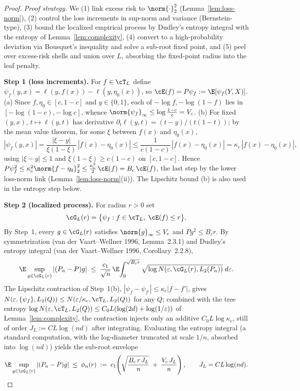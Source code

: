 \begin{proof}
\emph{Proof strategy.} We (1) link excess risk to $\norm{\cdot}_2^2$
(Lemma~\ref{lem:loss-norm}), (2) control the loss increments in sup-norm and
variance (Bernstein-type), (3) bound the localized empirical process by Dudley's
entropy integral with the entropy of Lemma~\ref{lem:complexity}, (4) convert to
a high-probability deviation via Bousquet's inequality and solve a sub-root
fixed point, and (5) peel over excess-risk shells and union over $L$, absorbing
the fixed-point radius into the leaf penalty.

\smallskip\noindent\textbf{Step 1 (loss increments).} For $f \in \cT_L$ define
$\psi_f(y,x) = \ell(y,f(x)) - \ell(y,\eta_0(x))$, so
$\cE(f) = P\psi_f := \E[\psi_f(Y,X)]$.
(a) Since $f,\eta_0 \in [c,1-c]$ and $y\in\{0,1\}$, each of $-\log f, -\log(1-f)$
lies in $[-\log(1-c), -\log c]$, whence
$\norm{\psi_f}_\infty \le \log\frac{1-c}{c} = V_c$.
(b) For fixed $(y,x)$, $t \mapsto \ell(y,t)$ has derivative
$\partial_t \ell(y,t) = (t-y)/(t(1-t))$; by the mean value theorem, for some
$\xi$ between $f(x)$ and $\eta_0(x)$,
\[
  |\psi_f(y,x)| = \frac{|\xi - y|}{\xi(1-\xi)}\,|f(x)-\eta_0(x)|
  \le \frac{1}{c(1-c)}\,|f(x)-\eta_0(x)| = \kappa_c\,|f(x)-\eta_0(x)|,
\]
using $|\xi - y| \le 1$ and $\xi(1-\xi) \ge c(1-c)$ on $[c,1-c]$. Hence
$P\psi_f^2 \le \kappa_c^2 \norm{f-\eta_0}_2^2
\le \tfrac{\kappa_c^2}{2}\,\cE(f) = B_c\,\cE(f)$,
the last step by the lower loss-norm link (Lemma~\ref{lem:loss-norm}(ii)). The
Lipschitz bound (b) is also used in the entropy step below.

\smallskip\noindent\textbf{Step 2 (localized process).} For radius $r>0$ set
\[
  \cG_L(r) = \bigl\{ \psi_f : f \in \cT_L,\; \cE(f) \le r \bigr\}.
\]
By Step~1, every $g \in \cG_L(r)$ satisfies $\norm{g}_\infty \le V_c$ and
$Pg^2 \le B_c r$. By symmetrization (van der Vaart--Wellner 1996, Lemma~2.3.1)
and Dudley's entropy integral (van der Vaart--Wellner 1996, Corollary~2.2.8),
\[
  \E \sup_{g \in \cG_L(r)} |(P_n - P)g|
  \;\le\; \frac{c_1}{\sqrt n}\,
     \E \!\int_0^{\sqrt{B_c r}}
       \sqrt{\log N(\varepsilon, \cG_L(r), L_2(P_n))}\; d\varepsilon.
\]
The Lipschitz contraction of Step~1(b), $|\psi_f - \psi_{f'}| \le
\kappa_c |f - f'|$, gives
$N(\varepsilon, \{\psi_f\}, L_2(Q)) \le N(\varepsilon/\kappa_c, \cT_L, L_2(Q))$
for any $Q$; combined with the tree entropy
$\log N(\varepsilon, \cT_L, L_2(Q)) \le C_0 L(\log(2d) + \log(1/\varepsilon))$
of Lemma~\ref{lem:complexity}, the contraction injects only an additive
$C_0 L \log\kappa_c$, still of order $J_L := C L \log(nd)$ after integrating.
Evaluating the entropy integral (a standard computation, with the log-diameter
truncated at scale $1/n$, absorbed into $\log(nd)$) yields the sub-root envelope
\begin{equation}\label{eq:phi}
  \E \sup_{g \in \cG_L(r)} |(P_n - P)g|
  \;\le\; \phi_n(r)
  \;:=\; c_1\!\left( \sqrt{\frac{B_c\, r\, J_L}{n}}
       \;+\; \frac{V_c\, J_L}{n} \right),
  \qquad J_L = C L \log(nd).
\end{equation}


\end{proof}
